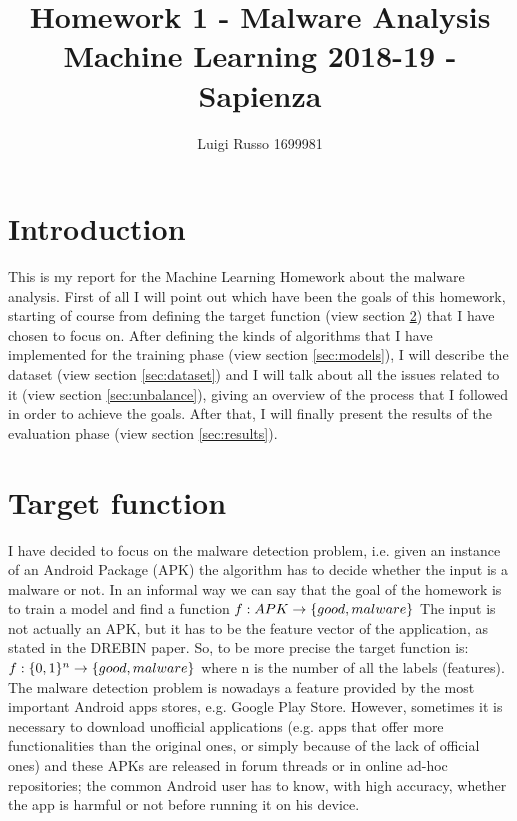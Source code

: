 \documentclass[12pt]{article}
\title{Homework 1 - Malware Analysis\\
	\large Machine Learning 2018-19 - Sapienza}
\author{Luigi Russo 1699981}
\begin{document}
	
\maketitle
\newpage
\tableofcontents
\newpage
\section{Introduction}
This is my report for the Machine Learning Homework about the malware analysis. First of all I will point out which have been the goals of this homework, starting of course from defining the target function (view section \ref{sec:target_function}) that I have chosen to focus on. After defining the kinds of algorithms that I have implemented for the training phase (view section \ref{sec:models}), I will describe the dataset (view section \ref{sec:dataset}) and I will talk about all the issues related to it (view section \ref{sec:unbalance}), giving an overview of the process that I followed in order to achieve the goals. After that, I will finally present the results of the evaluation phase (view section \ref{sec:results}).

\section{Target function}
\label{sec:target_function}
I have decided to focus on the malware detection problem, i.e. given an instance of an Android Package (APK) the algorithm has to decide whether the input is a malware or not. In an informal way we can say that the goal of the homework is to train a model and find a function
$\newline\newline f: APK \rightarrow \{good, malware\} \newline\newline$
The input is not actually an APK, but it has to be the feature vector of the application, as stated in the DREBIN \cite{DREBIN} paper. So, to be more precise the target function is:
$\newline\newline f: \{0,1\}^n  \rightarrow \{good, malware\} \newline\newline$ where n is the number of all the labels (features).
The malware detection problem is nowadays a feature provided by the most important Android apps stores, e.g. Google Play Store. However, sometimes it is necessary to download unofficial applications (e.g. apps that offer more functionalities than the original ones, or simply because of the lack of official ones) and these APKs are released in forum threads or in online ad-hoc repositories; the common Android user has to know, with high accuracy, whether the app is harmful or not before running it on his device.
\end{document}
